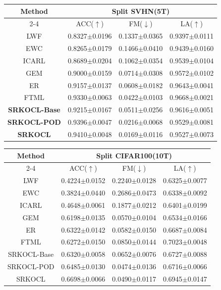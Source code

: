 \documentclass[review]{elsarticle}
\begin{document}
\begin{table}[!htbp]
	\centering
	\begin{tabular}{cccc}
		\hline
		\multirow{2}{*}{Method} & \multicolumn{3}{c}{Split SVHN(5T)}\\ \cline{2-4}
	&ACC($ \uparrow $)	 &FM($ \downarrow $) &LA($ \uparrow $)	
\\ \hline
LWF	&0.8327$ \pm $0.0196	 &0.1337$ \pm $0.0365	&0.9397$ \pm $0.0111 \\
EWC	&0.8265$ \pm $0.0179	 &0.1466$ \pm $0.0410	&0.9439$ \pm $0.0160 \\
ICARL	&0.8689$ \pm $0.0204
	&0.1062$ \pm $0.0354	&0.9539$ \pm $0.0104 \\
GEM	&0.9000$ \pm $0.0159	 &0.0714$ \pm $0.0308	&0.9572$ \pm $0.0102 \\
ER	&0.9157$ \pm $0.0137	&0.0608$ \pm $0.0182	&0.9643$ \pm $0.0041  \\
FTML	&0.9330$ \pm $0.0063	&0.0422$ \pm $0.0103	&0.9668$ \pm $0.0021 \\ \hline
\textbf{SRKOCL-Base}	&0.9215$ \pm $0.0167 	&0.0511$ \pm $0.0256	  &0.9616$ \pm $0.0051 \\
\textbf{SRKOCL-POD}	&0.9396$ \pm $0.0047	&0.0216$ \pm $0.0068	&0.9529$ \pm $0.0081 \\
\textbf{SRKOCL}	&0.9410$ \pm $0.0048	&0.0169$ \pm $0.0116	&0.9527$ \pm $0.0073 \\ \hline
	\end{tabular}
\end{table}

\begin{table}[!htbp]
	\centering
	\begin{tabular}{cccc}
		\hline
		\multirow{2}{*}{Method} & \multicolumn{3}{c}{Split CIFAR100(10T)}\\ \cline{2-4}
	&ACC($ \uparrow $)	 &FM($ \downarrow $) &LA($ \uparrow $)	
\\ \hline
LWF	&0.4224$ \pm $0.0152	&0.2240$ \pm $0.0128	&0.6325$ \pm $0.0077 \\
EWC	&0.3824$ \pm $0.0440	&0.2686$ \pm $0.0473	&0.6338$ \pm $0.0092 \\
ICARL	&0.4648$ \pm $0.0061
	&0.1877$ \pm $0.0212	&0.6401$ \pm $0.0199 \\
GEM	&0.6198$ \pm $0.0135	&0.0570$ \pm $0.0104	&0.6534$ \pm $0.0166 \\
ER	&0.6322$ \pm $0.0142	&0.0582$ \pm $0.0150	&0.6687$ \pm $0.0084 \\
FTML	&0.6272$ \pm $0.0150	&0.0850$ \pm $0.0144	&0.7023$ \pm $0.0048 \\ \hline
SRKOCL-Base	&0.6320$ \pm $0.0058	&0.0652$ \pm $0.0076	&0.6727$ \pm $0.0088 \\
SRKOCL-POD	&0.6485$ \pm $0.0130	&0.0474$ \pm $0.0136	&0.6716$ \pm $0.0066 \\
SRKOCL	&0.6698$ \pm $0.0066	&0.0490$ \pm $0.0117	&0.6945$ \pm $0.0147 \\ \hline
	\end{tabular}
\end{table}
\end{document}
